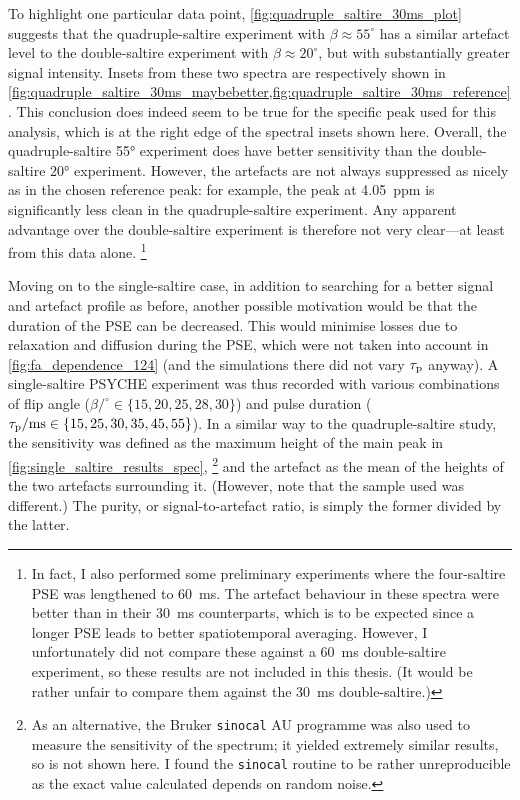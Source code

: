 To highlight one particular data point, \cref{fig:quadruple_saltire_30ms_plot} suggests that the quadruple-saltire experiment with $\beta \approx 55^\circ$ has a similar artefact level to the double-saltire experiment with $\beta \approx 20^\circ$, but with substantially greater signal intensity.
Insets from these two spectra are respectively shown in \cref{fig:quadruple_saltire_30ms_maybebetter,fig:quadruple_saltire_30ms_reference}.
This conclusion does indeed seem to be true for the specific peak used for this analysis, which is at the right edge of the spectral insets shown here.
Overall, the quadruple-saltire \ang{55} experiment does have better sensitivity than the double-saltire \ang{20} experiment.
However, the artefacts are not always suppressed as nicely as in the chosen reference peak: for example, the peak at \SI{4.05}{ppm} is significantly less clean in the quadruple-saltire experiment.
Any apparent advantage over the double-saltire experiment is therefore not very clear---at least from this data alone.%
\footnote{In fact, I also performed some preliminary experiments where the four-saltire PSE was lengthened to \SI{60}{\ms}. The artefact behaviour in these spectra were better than in their \SI{30}{\ms} counterparts, which is to be expected since a longer PSE leads to better spatiotemporal averaging. However, I unfortunately did not compare these against a \SI{60}{\ms} double-saltire experiment, so these results are not included in this thesis. (It would be rather unfair to compare them against the \SI{30}{\ms} double-saltire.)}

Moving on to the single-saltire case, in addition to searching for a better signal and artefact profile as before, another possible motivation would be that the duration of the PSE can be decreased.
This would minimise losses due to relaxation and diffusion during the PSE, which were not taken into account in \cref{fig:fa_dependence_124} (and the simulations there did not vary $\tau_\mathrm{p}$ anyway).
A single-saltire PSYCHE experiment was thus recorded with various combinations of flip angle ($\beta/^\circ \in \{15, 20, 25, 28, 30\}$) and pulse duration ($\tau_\mathrm{p}/\text{ms} \in \{15, 25, 30, 35, 45, 55\}$).
In a similar way to the quadruple-saltire study, the sensitivity was defined as the maximum height of the main peak in \cref{fig:single_saltire_results_spec},%
\footnote{As an alternative, the Bruker \texttt{sinocal} AU programme was also used to measure the sensitivity of the spectrum; it yielded extremely similar results, so is not shown here. I found the \texttt{sinocal} routine to be rather unreproducible as the exact value calculated depends on random noise.}
and the artefact as the mean of the heights of the two artefacts surrounding it.
(However, note that the sample used was different.)
The purity, or signal-to-artefact ratio, is simply the former divided by the latter.

